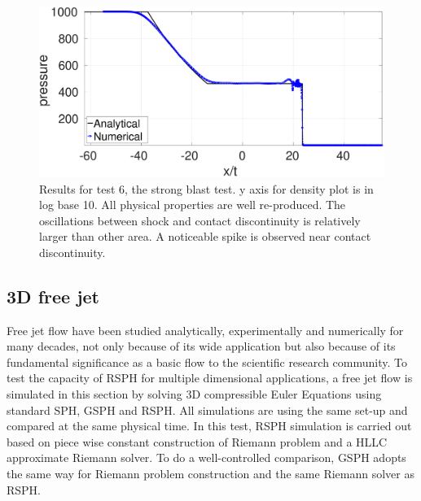 \documentclass[review]{elsarticle}
\begin{document}
\begin{figure}[H]
\begin{minipage}{.495 \textwidth}
    \end{minipage}%
    \begin{minipage}{.495 \textwidth}
        \centering
        \includegraphics[width=0.99 \textwidth]{./Figures/strong-blast/StrBlst-RCM-p-Rp3}
    \end{minipage}%
    \caption{Results for test 6, the strong blast test. y axis for density plot is in log base 10. All physical properties are well re-produced. The oscillations between shock and contact discontinuity is relatively larger than other area. A noticeable spike is observed near contact discontinuity.}
    \label{fig:RCM-strong-blast}
\end{figure}

\subsection{3D free jet}
Free jet flow have been studied analytically, experimentally and numerically for many decades, not only because of its wide application but also because of its fundamental significance as a basic flow to the scientific research community. To test the capacity of RSPH for multiple dimensional applications, a free jet flow is simulated in this section by solving 3D compressible Euler Equations using standard SPH, GSPH and RSPH. 
All simulations are using the same set-up and compared at the same physical time. In this test, RSPH simulation is carried out based on piece wise constant construction of Riemann problem and a HLLC approximate Riemann solver. To do a well-controlled comparison, GSPH adopts the same way for Riemann problem construction and the same Riemann solver as RSPH. 
\end{document}
